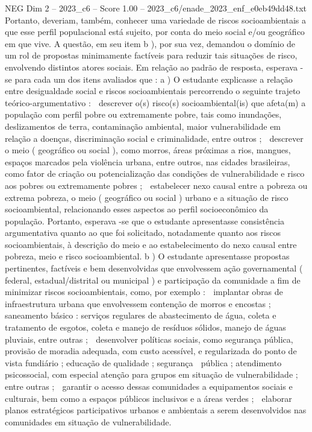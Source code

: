 \begin{textsample}{NEG Dim 2 – 2023\_c6 – Score 1.00 – 2023\_c6/enade\_2023\_enf\_e0eb49dd48.txt}
Portanto, deveriam, também, conhecer uma variedade de riscos socioambientais a que esse perfil populacional está sujeito, por conta do meio social e/ou geográfico em que vive.
A questão, em seu item b ), por sua vez, demandou o domínio de um rol de propostas minimamente factíveis para reduzir tais situações de risco, envolvendo distintos atores sociais.
Em relação ao padrão de resposta, esperava -se para cada um dos itens avaliados que : a ) O estudante explicasse a relação entre desigualdade social e riscos socioambientais percorrendo o seguinte trajeto teórico-argumentativo :  descrever o(s) risco(s) socioambiental(is) que afeta(m) a população com perfil pobre ou extremamente pobre, tais como inundações, deslizamentos de terra, contaminação ambiental, maior vulnerabilidade em relação a doenças, discriminação social e criminalidade, entre outros ;  descrever o meio ( geográfico ou social ), como morros, áreas próximas a rios, mangues, espaços marcados pela violência urbana, entre outros, nas cidades brasileiras, como fator de criação ou potencialização das condições de vulnerabilidade e risco aos pobres ou extremamente pobres ;  estabelecer nexo causal entre a pobreza ou extrema pobreza, o meio ( geográfico ou social ) urbano e a situação de risco socioambiental, relacionando esses aspectos ao perfil socioeconômico da população.
Portanto, esperava -se que o estudante apresentasse consistência argumentativa quanto ao que foi solicitado, notadamente quanto aos riscos socioambientais, à descrição do meio e ao estabelecimento do nexo causal entre pobreza, meio e risco socioambiental. b ) O estudante apresentasse propostas pertinentes, factíveis e bem desenvolvidas que envolvessem ação governamental ( federal, estadual/distrital ou municipal ) e participação da comunidade a fim de minimizar riscos socioambientais, como, por exemplo :  implantar obras de infraestrutura urbana que envolvessem contenção de morros e encostas ; saneamento básico : serviços regulares de abastecimento de água, coleta e tratamento de esgotos, coleta e manejo de resíduos sólidos, manejo de águas pluviais, entre outras ;  desenvolver políticas sociais, como segurança pública, provisão de moradia adequada, com custo acessível, e regularizada do ponto de vista fundiário ; educação de qualidade ; segurança  pública ; atendimento psicossocial, com especial atenção para grupos em situação de vulnerabilidade ; entre outras ;  garantir o acesso dessas comunidades a equipamentos sociais e culturais, bem como a espaços públicos inclusivos e a áreas verdes ;  elaborar planos estratégicos participativos urbanos e ambientais a serem desenvolvidos nas comunidades em situação de vulnerabilidade.

\end{textsample}
